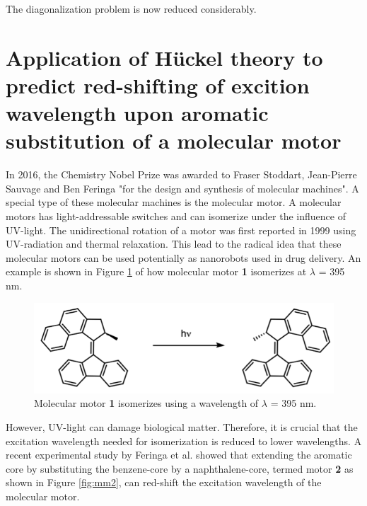 \documentclass{article}
\begin{document}
The diagonalization problem is now reduced considerably.
\clearpage

\section*{Application of H\"uckel theory to predict red-shifting of excition wavelength upon aromatic substitution of a molecular motor}
In 2016, the Chemistry Nobel Prize was awarded to Fraser Stoddart, Jean-Pierre Sauvage and Ben Feringa "for the design and synthesis of molecular machines".\cite{nobelprizechemistry2016} A special type of these molecular machines is the molecular motor. A molecular motors has light-addressable switches and can isomerize under the influence of UV-light.\cite{Feringa2012} The unidirectional rotation of a motor was first reported in 1999 using UV-radiation and thermal relaxation.\cite{Koumura1999} This lead to the radical idea that these molecular motors can be used potentially as nanorobots used in drug delivery. An example is shown in Figure \ref{fig:mm1} of how molecular motor \textbf{1} isomerizes at $\lambda$ = 395 nm.

\begin{figure}[h]
\centering
\includegraphics[scale=0.75]{./images/scheme1.png}
\caption{Molecular motor \textbf{1} isomerizes using a wavelength of $\lambda$ = 395 nm.}
\label{fig:mm1}
\end{figure} 

However, UV-light can damage biological matter. Therefore, it is crucial that the excitation wavelength needed for isomerization is reduced to lower wavelengths. A recent experimental study by Feringa et al. showed that extending the aromatic core by substituting the benzene-core by a naphthalene-core, termed motor \textbf{2} as shown in Figure \ref{fig:mm2}, can red-shift the excitation wavelength of the molecular motor.\cite{VanLeeuwen2017} 
\end{document}

